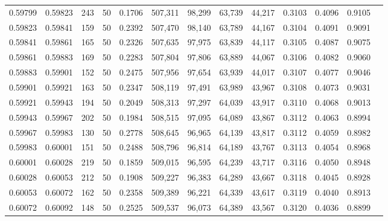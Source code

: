 \begin{tabular}{rrrrrrrrrrrrr}
0.59799 & 0.59823 &   243 &  50 &                                     0.1706 & 507,311 &  98,299 &  63,739 &  44,217 & 0.3103 & 0.4096 & 0.9105 \\
0.59823 & 0.59841 &   159 &  50 &                                     0.2392 & 507,470 &  98,140 &  63,789 &  44,167 & 0.3104 & 0.4091 & 0.9091 \\
0.59841 & 0.59861 &   165 &  50 &                                     0.2326 & 507,635 &  97,975 &  63,839 &  44,117 & 0.3105 & 0.4087 & 0.9075 \\
0.59861 & 0.59883 &   169 &  50 &                                     0.2283 & 507,804 &  97,806 &  63,889 &  44,067 & 0.3106 & 0.4082 & 0.9060 \\
0.59883 & 0.59901 &   152 &  50 &                                     0.2475 & 507,956 &  97,654 &  63,939 &  44,017 & 0.3107 & 0.4077 & 0.9046 \\
0.59901 & 0.59921 &   163 &  50 &                                     0.2347 & 508,119 &  97,491 &  63,989 &  43,967 & 0.3108 & 0.4073 & 0.9031 \\
0.59921 & 0.59943 &   194 &  50 &                                     0.2049 & 508,313 &  97,297 &  64,039 &  43,917 & 0.3110 & 0.4068 & 0.9013 \\
0.59943 & 0.59967 &   202 &  50 &                                     0.1984 & 508,515 &  97,095 &  64,089 &  43,867 & 0.3112 & 0.4063 & 0.8994 \\
0.59967 & 0.59983 &   130 &  50 &                                     0.2778 & 508,645 &  96,965 &  64,139 &  43,817 & 0.3112 & 0.4059 & 0.8982 \\
0.59983 & 0.60001 &   151 &  50 &                                     0.2488 & 508,796 &  96,814 &  64,189 &  43,767 & 0.3113 & 0.4054 & 0.8968 \\
0.60001 & 0.60028 &   219 &  50 &                                     0.1859 & 509,015 &  96,595 &  64,239 &  43,717 & 0.3116 & 0.4050 & 0.8948 \\
0.60028 & 0.60053 &   212 &  50 &                                     0.1908 & 509,227 &  96,383 &  64,289 &  43,667 & 0.3118 & 0.4045 & 0.8928 \\
0.60053 & 0.60072 &   162 &  50 &                                     0.2358 & 509,389 &  96,221 &  64,339 &  43,617 & 0.3119 & 0.4040 & 0.8913 \\
0.60072 & 0.60092 &   148 &  50 &                                     0.2525 & 509,537 &  96,073 &  64,389 &  43,567 & 0.3120 & 0.4036 & 0.8899 \\

\end{tabular}

